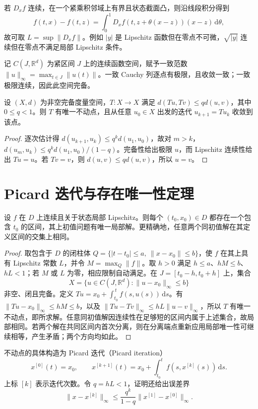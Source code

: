 \documentclass[UTF8,12pt,a4paper,fontset=fandol]{ctexbook}
\begin{document}
若 $D_xf$ 连续，在一个紧乘积邻域上有界且状态截面凸，则沿线段积分得到
\[
 f(t,x)-f(t,z)=\int_0^1D_xf(t,z+\theta(x-z))(x-z)\,\mathrm d\theta,
\]
故可取 $L=\sup\|D_xf\|$。例如 $|y|$ 是 Lipschitz 函数但在零点不可微，$\sqrt{|y|}$ 连续但在零点不满足局部 Lipschitz 条件。

记 $C(J,\mathbb R^d)$ 为紧区间 $J$ 上的连续函数空间，赋予一致范数 $\|u\|_\infty=\max_{t\in J}\|u(t)\|$。一致 Cauchy 列逐点有极限，且收敛一致；一致极限连续，因此此空间完备。

\begin{theorem}[压缩映射原理]
设 $(X,d)$ 为非空完备度量空间，$T:X\to X$ 满足 $d(Tu,Tv)\leq qd(u,v)$，其中 $0\leq q<1$。则 $T$ 有唯一不动点，且从任意 $u_0\in X$ 出发的迭代 $u_{k+1}=Tu_k$ 收敛到该点。
\end{theorem}
\begin{proof}
逐次估计得 $d(u_{k+1},u_k)\leq q^kd(u_1,u_0)$，故对 $m>k$，$d(u_m,u_k)\leq q^kd(u_1,u_0)/(1-q)$。完备性给出极限 $u$，而 Lipschitz 连续性给出 $Tu=u$。若 $Tv=v$，则 $d(u,v)\leq qd(u,v)$，所以 $u=v$。
\end{proof}

\section{Picard 迭代与存在唯一性定理}
\begin{theorem}
\label{thm:ode-picard}
设 $f$ 在 $D$ 上连续且关于状态局部 Lipschitz。则每个 $(t_0,x_0)\in D$ 都存在一个包含 $t_0$ 的区间，其上初值问题有唯一局部解。更精确地，任意两个同初值解在其定义区间的交集上相同。
\end{theorem}
\begin{proof}
取包含于 $D$ 的闭柱体 $Q=\{|t-t_0|\leq a,\ \|x-x_0\|\leq b\}$，使 $f$ 在其上具有 Lipschitz 常数 $L$，并令 $M=\max_Q\|f\|$。取 $h>0$ 满足 $h\leq a$、$hM\leq b$、$hL<1$；若 $M$ 或 $L$ 为零，相应限制自动满足。在 $J=[t_0-h,t_0+h]$ 上，集合
\[
 X=\{u\in C(J,\mathbb R^d):\|u-x_0\|_\infty\leq b\}
\]
非空、闭且完备。定义 $Tu=x_0+\int_{t_0}^{\,t}f(s,u(s))\,\mathrm ds$。有 $\|Tu-x_0\|_\infty\leq hM\leq b$，以及 $\|Tu-Tv\|_\infty\leq hL\|u-v\|_\infty$，所以 $T$ 有唯一不动点，即所求解。任意同初值解因连续性在足够短的区间内属于上述集合，故局部相同。若两个解在共同区间内首次分离，则在分离端点重新应用局部唯一性可继续相等，产生矛盾；两个方向均如此。
\end{proof}

不动点的具体构造为 Picard 迭代（Picard iteration）
\[
 x^{[0]}(t)=x_0,\qquad x^{[k+1]}(t)=x_0+\int_{t_0}^t f(s,x^{[k]}(s))\,\mathrm ds.
\]
上标 $[k]$ 表示迭代次数。令 $q=hL<1$，证明还给出误差界
\[
 \|x-x^{[k]}\|_\infty\leq\frac{q^k}{1-q}\|x^{[1]}-x^{[0]}\|_\infty.
\]
\end{document}
